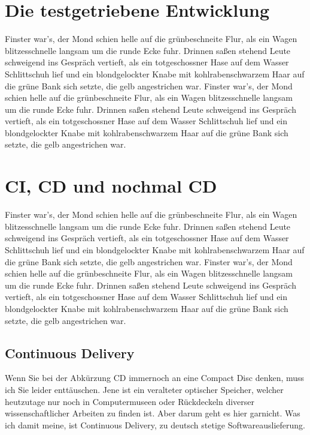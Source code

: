 \section{Die testgetriebene Entwicklung}

Finster war's, der Mond schien helle auf die grünbeschneite Flur, als
ein Wagen blitzesschnelle langsam um die runde Ecke fuhr. Drinnen
saßen stehend Leute schweigend ins Gespräch vertieft, als ein
totgeschossner Hase auf dem Wasser Schlittschuh lief und ein
blondgelockter Knabe mit kohlrabenschwarzem Haar auf die grüne Bank
sich setzte, die gelb angestrichen war.
Finster war's, der Mond schien helle auf die grünbeschneite Flur, als
ein Wagen blitzesschnelle langsam um die runde Ecke fuhr. Drinnen
saßen stehend Leute schweigend ins Gespräch vertieft, als ein
totgeschossner Hase auf dem Wasser Schlittschuh lief und ein
blondgelockter Knabe mit kohlrabenschwarzem Haar auf die grüne Bank
sich setzte, die gelb angestrichen war.

\section{CI, CD und nochmal CD}
\label{sec:ci-cd-und-nochmal-cd}


Finster war's, der Mond schien helle auf die grünbeschneite Flur, als
ein Wagen blitzesschnelle langsam um die runde Ecke fuhr. Drinnen
saßen stehend Leute schweigend ins Gespräch vertieft, als ein
totgeschossner Hase auf dem Wasser Schlittschuh lief und ein
blondgelockter Knabe mit kohlrabenschwarzem Haar auf die grüne Bank
sich setzte, die gelb angestrichen war.
Finster war's, der Mond schien helle auf die grünbeschneite Flur, als
ein Wagen blitzesschnelle langsam um die runde Ecke fuhr. Drinnen
saßen stehend Leute schweigend ins Gespräch vertieft, als ein
totgeschossner Hase auf dem Wasser Schlittschuh lief und ein
blondgelockter Knabe mit kohlrabenschwarzem Haar auf die grüne Bank
sich setzte, die gelb angestrichen war.


\subsection{Continuous Delivery}
\label{subsec:continuous-delivery}
Wenn Sie bei der Abkürzung CD immernoch an eine Compact Disc denken, muss ich Sie leider enttäuschen. Jene ist ein veralteter optischer Speicher, welcher heutzutage nur noch in Computermuseen oder Rückdeckeln diverser wissenschaftlicher Arbeiten zu finden ist. Aber darum geht es hier garnicht. Was ich damit meine, ist Continuous Delivery, zu deutsch stetige Softwareauslieferung.


